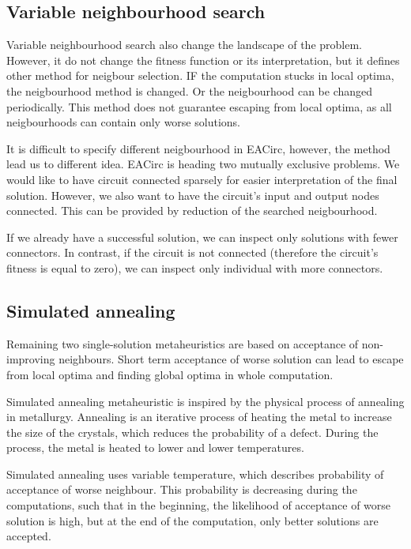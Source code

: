 \documentclass[
  print, %
  Table,   %
  nolof,     %
  nolot,     %
  11pt, %
  oneside  %
]{fithesis3}
\begin{document}
\subsection{Variable neighbourhood search}
\label{subsec:opt-single-sol-vns}

Variable neighbourhood search also change the landscape of the problem. However, it do not change the fitness function or its interpretation, but it defines other method for neigbour selection. IF the computation stucks in local optima, the neigbourhood method is changed. Or the neigbourhood can be changed periodically. This method does not guarantee escaping from local optima, as all neigbourhoods can contain only worse solutions.

It is difficult to specify different neigbourhood in EACirc, however, the method lead us to different idea. EACirc is heading two mutually exclusive problems. We would like to have circuit connected sparsely for easier interpretation of the final solution. However, we also want to have the circuit's input and output nodes connected. This can be provided by reduction of the searched neigbourhood.

If we already have a successful solution, we can inspect only solutions with fewer connectors. In contrast, if the circuit is not connected (therefore the circuit's fitness is equal to zero), we can inspect only individual with more connectors.

\subsection{Simulated annealing}
\label{subsec:opt-single-sol-sa}

Remaining two single-solution metaheuristics are based on acceptance of non-improving neighbours. Short term acceptance of worse solution can lead to escape from local optima and finding global optima in whole computation.

Simulated annealing metaheuristic is inspired by the physical process of annealing in metallurgy. Annealing is an iterative process of heating the metal to increase the size of the crystals, which reduces the probability of a defect. During the process, the metal is heated to lower and lower temperatures.

Simulated annealing uses variable temperature, which describes probability of acceptance of worse neighbour. This probability is decreasing during the computations, such that in the beginning, the likelihood of acceptance of worse solution is high, but at the end of the computation, only better solutions are accepted.
\end{document}
